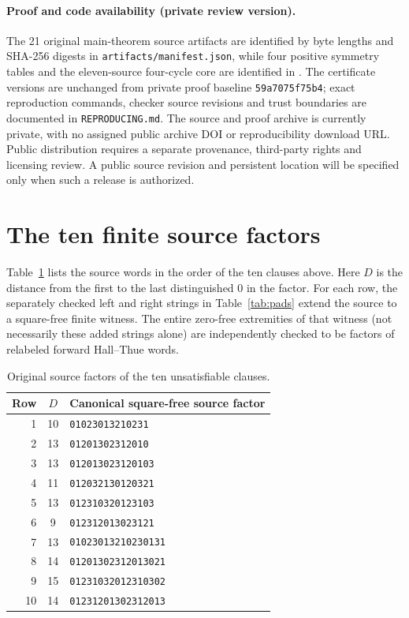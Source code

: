 \documentclass[11pt]{article}
\theoremstyle{remark}
\begin{document}
\paragraph{Proof and code availability (private review version).}
The 21 original main-theorem source artifacts are identified by
byte lengths and SHA-256 digests in
\texttt{artifacts/manifest.json}, while four positive
symmetry tables and the eleven-source four-cycle core
are identified in
.
The certificate versions are unchanged from private proof
baseline \texttt{59a7075f75b4}; exact reproduction commands,
checker source revisions and trust boundaries are documented
in \texttt{REPRODUCING.md}. The source and proof archive
is currently private, with no assigned public archive DOI
or reproducibility download URL. Public distribution requires
a separate provenance, third-party rights and licensing review.
A public source revision and persistent location will be
specified only when such a release is authorized.

\begingroup
\small


\endgroup

\clearpage
\appendix
\section{The ten finite source factors}

Table~\ref{tab:sources} lists the source words in the order of the
ten clauses above. Here $D$ is the distance from the first to
the last distinguished $0$ in the factor. For each row, the
separately checked left and right strings in
Table~\ref{tab:pads} extend the source to a square-free
finite witness. The entire zero-free extremities of that
witness (not necessarily these added strings alone) are
independently checked to be factors of relabeled forward
Hall--Thue words.

\begin{table}[ht]
\centering
\small
\begin{tabular}{rcl}
\toprule
Row & $D$ & Canonical square-free source factor\\
\midrule
1 & 10 & \texttt{01023013210231}\\
2 & 13 & \texttt{01201302312010}\\
3 & 13 & \texttt{012013023120103}\\
4 & 11 & \texttt{012032130120321}\\
5 & 13 & \texttt{012310320123103}\\
6 & 9 & \texttt{012312013023121}\\
7 & 13 & \texttt{01023013210230131}\\
8 & 14 & \texttt{01201302312013021}\\
9 & 15 & \texttt{01231032012310302}\\
10 & 14 & \texttt{01231201302312013}\\
\bottomrule
\end{tabular}
\caption{Original source factors of the ten unsatisfiable clauses.}
\label{tab:sources}
\end{table}
\end{document}
